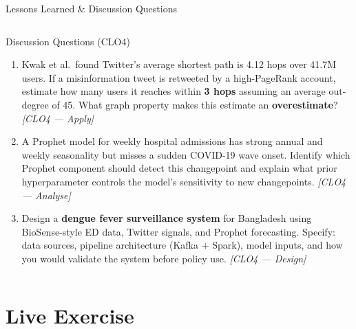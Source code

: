 \documentclass[aspectratio=169,10pt]{beamer}
\begin{document}
\begin{frame}{Lessons Learned \& Discussion Questions}
\begin{columns}[T]
      \begin{alertblock}{Discussion Questions \textmd{\tiny (CLO4)}}
        \begin{enumerate}
          \item Kwak et al.\ found Twitter's average shortest path
                is 4.12 hops over 41.7M users.
                If a misinformation tweet is retweeted by
                a high-PageRank account, estimate how many users
                it reaches within \textbf{3 hops} assuming
                an average out-degree of 45.
                What graph property makes this estimate an
                \textbf{overestimate}?
                \textit{[CLO4 — Apply]}
          \item A Prophet model for weekly hospital admissions
                has strong annual and weekly seasonality but
                misses a sudden COVID-19 wave onset.
                Identify which Prophet component should detect
                this changepoint and explain what prior
                hyperparameter controls the model's sensitivity
                to new changepoints.
                \textit{[CLO4 — Analyse]}
          \item Design a \textbf{dengue fever surveillance system}
                for Bangladesh using BioSense-style ED data,
                Twitter signals, and Prophet forecasting.
                Specify: data sources, pipeline architecture
                (Kafka + Spark), model inputs, and how you
                would validate the system before policy use.
                \textit{[CLO4 — Design]}
        \end{enumerate}
      \end{alertblock}
  \end{columns}
\end{frame}

\section{Live Exercise}
\end{document}
